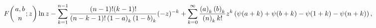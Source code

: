 \[\mathop{F\/}\nolimits\!\left({a,b\atop n};z\right)\mathop{\ln\/}\nolimits z-%
\sum_{k=1}^{n-1}\frac{(n-1)!(k-1)!}{(n-k-1)!\left(1-a\right)_{k}\left(1-b%
\right)_{k}}(-z)^{-k}\\
+\sum_{k=0}^{\infty}\frac{\left(a\right)_{k}\left(b\right)_{k}}{\left(n\right)%
_{k}k!}z^{k}\left(\mathop{\psi\/}\nolimits\!\left(a+k\right)+\mathop{\psi\/}%
\nolimits\!\left(b+k\right)-\mathop{\psi\/}\nolimits\!\left(1+k\right)-\mathop%
{\psi\/}\nolimits\!\left(n+k\right)\right),\]